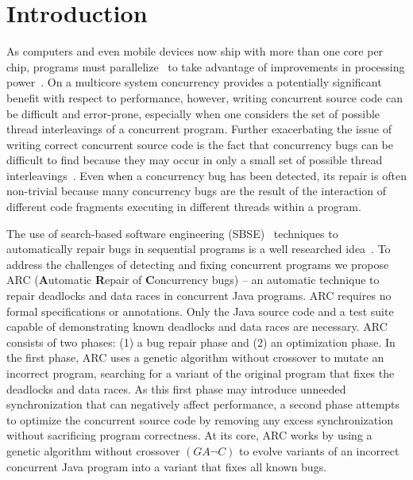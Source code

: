 \documentclass[runningheads,a4paper]{llncs}
\begin{document}
 \section{Introduction}
\label{sec:introduction}

As computers and even mobile devices now ship with more than one core per chip, programs must parallelize~ to take advantage of improvements in processing power~\cite{SL05}. %
On a multicore system concurrency provides a potentially significant benefit with respect to performance, however, writing concurrent source code can be difficult and error-prone, especially when one considers the set of possible thread interleavings of a concurrent program. Further exacerbating the issue of writing correct concurrent source code is the fact that concurrency bugs can be difficult to find because they may occur in only a small set of possible thread interleavings~\cite{MQB07}. Even when a concurrency bug has been detected, its repair is often non-trivial because many concurrency bugs are the result of the interaction of different code fragments executing in different threads within a program. 

The use of search-based software engineering (SBSE)~\cite{Har+10} techniques to automatically repair bugs in sequential programs is a well researched idea~\cite{FNWG09, WNLF09, NWLF09, WFGN10, GNFW11, LDFW12}. To address the challenges of detecting and fixing concurrent programs we propose ARC (\textbf{A}utomatic \textbf{R}epair of \textbf{C}oncurrency bugs) -- an automatic technique to repair deadlocks and data races in concurrent Java programs. ARC requires no formal specifications or annotations. Only the Java source code and a test suite capable of demonstrating known deadlocks and data races are necessary. ARC consists of two phases: (1) a bug repair phase and (2) an optimization phase. In the first phase, ARC uses a genetic algorithm without crossover to mutate an incorrect program, searching for a variant of the original program that fixes the deadlocks and data races. As this first phase may introduce unneeded synchronization that can negatively affect performance, a second phase attempts to optimize the concurrent source code by removing any excess synchronization without sacrificing program correctness. At its core, ARC works by using a genetic algorithm without crossover $(GA \neg C)$ to evolve variants of an incorrect concurrent Java program into a variant that fixes all known bugs. 
\end{document}
